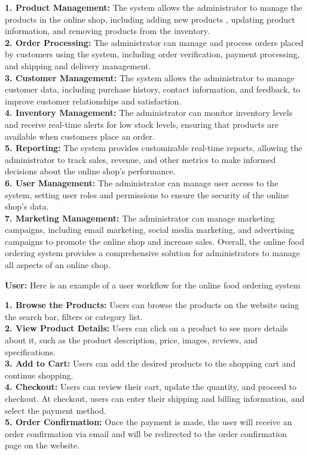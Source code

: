 \begin{itemize}
    \textbf{1. Product Management: }The system allows the administrator to
    manage the products in the online shop, including adding new
    products , updating product information, and removing
    products from the inventory.\\
    \textbf{2. Order Processing: }The administrator can manage and process
    orders placed by customers using the system, including order
    verification, payment processing, and shipping and delivery
    management.\\
    \textbf{3. Customer Management:} The system allows the administrator
    to manage customer data, including purchase history, contact
    information, and feedback, to improve customer relationships
    and satisfaction.\\
    \textbf{4. Inventory Management:} The administrator can monitor
    inventory levels and receive real-time alerts for low stock levels,
    ensuring that products are available when customers place an
    order.\\
    \textbf{5. Reporting:} The system provides customizable real-time
    reports, allowing the administrator to track sales, revenue, and
    other metrics to make informed decisions about the online
    shop's performance.\\
    
    \textbf{6. User Management:} The administrator can manage user access to the system, setting user roles and permissions to  ensure the security of the online shop's data.\\
    \textbf{7. Marketing Management: }The administrator can manage
    marketing campaigns, including email marketing, social media
    marketing, and advertising campaigns to promote the online
    shop and increase sales.
    Overall, the online food ordering system provides a comprehensive
    solution for administrators to manage all aspects of an online shop.
 \end{itemize}


\textbf{User:}
Here is an example of a user workflow for the online food ordering system
 \begin{itemize}
    \textbf{1. Browse the Products:} Users can browse the products on the website using the search bar, filters or category list.\\
    
    \textbf{2. View Product Details:} Users can click on a product to see more details about it, such as the product description, price, images, reviews, and specifications.
    \\
    \textbf{3. Add to Cart:} Users can add the desired products to the shopping cart and continue shopping.
    \\
    \textbf{4. Checkout:} Users can review their cart, update the quantity, and proceed to checkout. At checkout, users can enter their shipping and billing information, and select the payment method.
    \\
    \textbf{5. Order Confirmation:} Once the payment is made, the user will receive an order confirmation via email and will be redirected to the order confirmation page on the website.

 \end{itemize}
